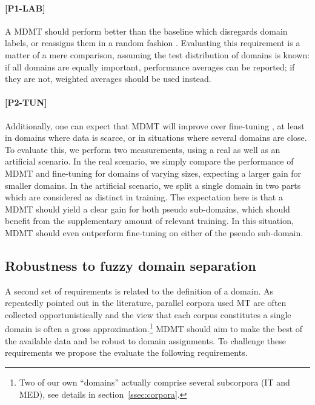 \documentclass[11pt,a4paper]{article}
\newcommand{\fyDone}[1]{\done[FY]\Todo[FY:]{\textcolor{orange}{#1}}}
\newcommand{\fyFuture}[1]{\done[FY]\Todo[FY:]{\textcolor{red}{#1}}}
\newcommand{\jcDone}[1]{\done[JC]\Todo[JC:]{\textcolor{red}{#1}}}
\begin{document}
\paragraph{[P1-LAB]}\fyDone{Decide naming scheme}A MDMT should perform better than the baseline which disregards domain labels, or reassigns them in a random fashion \cite{Joshi12multidomain}. Evaluating this requirement is a matter of a mere comparison, assuming the test distribution of domains is known: if all domains are equally important, performance averages can be reported; if they are not, weighted averages should be used instead.\fyFuture{Try random label assignments ?} %

\paragraph{[P2-TUN]} Additionally, one can expect that MDMT will improve over fine-tuning \cite{Luong15stanford,Freitag16fast}, at least in domains where data is scarce, or in situations where several domains are close. To evaluate this, we perform two measurements, using a real as well as an artificial scenario. In the real scenario, we simply compare the performance of MDMT and fine-tuning for domains of varying sizes, expecting a larger gain for smaller domains. In the artificial scenario, we split a single domain in two parts which are considered as distinct in training. The expectation here is that a MDMT should yield a clear gain for both pseudo sub-domains, which should benefit from the supplementary amount of relevant training. In this situation, MDMT should even outperform fine-tuning on either of the pseudo sub-domain.
\jcDone{I dont understand the prediction... why running MDMT on 2 artificial subdomains should show  gains over fine-tunning?}\fyDone{small loss with respect to non split ?}

\subsection{Robustness to fuzzy domain separation \label{ssec:robusness}}
A second set of requirements is related to the definition of a domain. As repeatedly pointed out in the literature, parallel corpora used MT are often collected opportunistically and the view that each corpus constitutes a single domain is often a gross approximation.\footnote{Two of our own ``domains'' actually comprise several subcorpora (IT and MED), see details in section~\ref{ssec:corpora}.} MDMT should aim to make the best of the available data and be robust to domain assignments. To challenge these requirements we propose the evaluate the following requirements.
\end{document}

